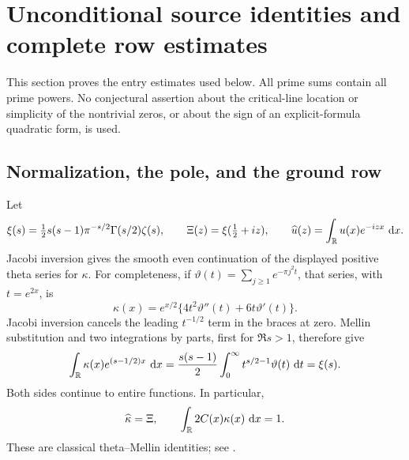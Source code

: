 \section{Unconditional source identities and complete row estimates}
\label{sec:source-dependencies}

This section proves the entry estimates used below. All prime sums contain
all prime powers. No conjectural assertion about the critical-line location or simplicity
of the nontrivial zeros, or about the sign of an explicit-formula quadratic
form, is used.

\subsection{Normalization, the pole, and the ground row}
Let
\[
 \xi(s)=\tfrac12s(s-1)\pi^{-s/2}\Gamma(s/2)\zeta(s),\qquad
 \Xi(z)=\xi(\tfrac12+iz),\qquad
 \widehat u(z)=\int_{\mathbb R}u(x)e^{-izx}\,\,\mathrm d x.
\]
Jacobi inversion gives the smooth even continuation of the displayed
positive theta series for $\kappa$. For completeness, if
$\vartheta(t)=\sum_{j\geq1}e^{-\pi j^2t}$, that series, with $t=e^{2x}$,
is
\[
 \kappa(x)=e^{x/2}\{4t^2\vartheta''(t)+6t\vartheta'(t)\}.
\]
Jacobi inversion cancels the leading $t^{-1/2}$ term in the braces at zero.
Mellin substitution and two integrations by parts, first for $\Re s>1$,
therefore give
\[
 \int_{\mathbb R}\kappa(x)e^{(s-1/2)x}\,\,\mathrm d x
 =\frac{s(s-1)}2\int_0^\infty t^{s/2-1}\vartheta(t)\,\,\mathrm d t
 =\xi(s).
\]
Both sides continue to entire functions. In particular,
\begin{equation}\label{eq:dep-normalization}
 \widehat\kappa=\Xi,\qquad
 \int_{\mathbb R}2C(x)\kappa(x)\,\,\mathrm d x=1.
\end{equation}
These are classical theta--Mellin identities; see \cite{Romik2021}.


